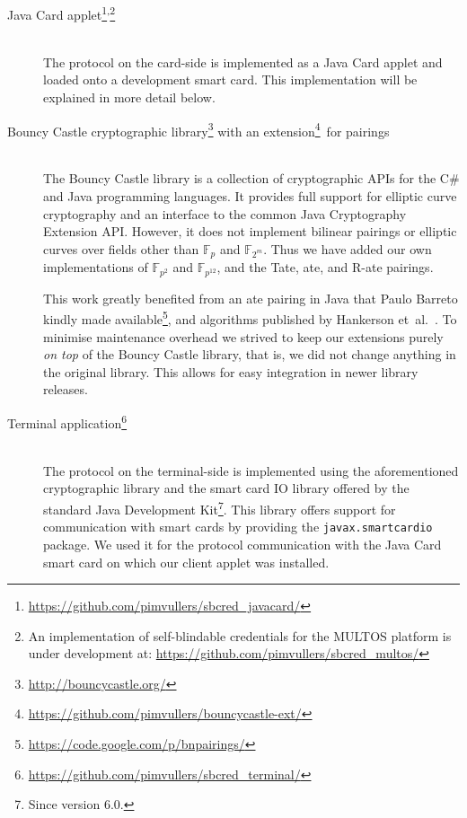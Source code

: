 \begin{savenotes}
\begin{description}
  \item[Java Card applet\footnote{\url{https://github.com/pimvullers/sbcred_javacard/}
    }\textsuperscript{,}\footnote{An implementation of self-blindable
    credentials for the MULTOS platform is under development at:
    \url{https://github.com/pimvullers/sbcred_multos/}}] ~\\
    The protocol on the card-side is implemented as a Java Card applet and
    loaded onto a development smart card. This implementation will be explained
    in more detail below.

  \item[Bouncy Castle cryptographic library\footnote{\url{http://bouncycastle.org/}}
    with an extension\footnote{\url{https://github.com/pimvullers/bouncycastle-ext/}}\
    for  pairings] ~\\
    The Bouncy Castle library is a collection of
    cryptographic APIs for the C\# and Java programming languages. It provides
    full support for elliptic curve cryptography and an interface to the common
    Java Cryptography Extension API. However, it does not implement bilinear
    pairings\index{bilinear pairing} or elliptic curves over fields other than $\mathbb{F}_p$ and
    $\mathbb{F}_{2^m}$. Thus we have added our own implementations of
    $\mathbb{F}_{p^2}$ and $\mathbb{F}_{p^{12}}$, and the Tate, ate, and R-ate
    pairings.

    This work greatly benefited from an ate pairing in Java that Paulo Barreto
    kindly made available\footnote{\url{https://code.google.com/p/bnpairings/}},
    and algorithms published by Hankerson et~al.~\cite{HankersonMS09}. To
    minimise maintenance overhead we strived to keep our extensions purely
    \emph{on top} of the Bouncy Castle library, that is, we did not change
    anything in the original library. This allows for easy integration in newer
    library releases.

  \item[Terminal application\footnote{\url{https://github.com/pimvullers/sbcred_terminal/}}] ~\\
    The protocol on the terminal-side is implemented using the aforementioned
    cryptographic library and the smart card IO library offered by the standard
    Java Development Kit\footnote{Since version 6.0.}. This library offers
    support for communication with smart cards by providing the
    \texttt{javax.smartcardio} package. We used it for the protocol communication
    with the Java Card\index{Java Card} smart card on which our client applet was installed.
\end{description}
\end{savenotes}

